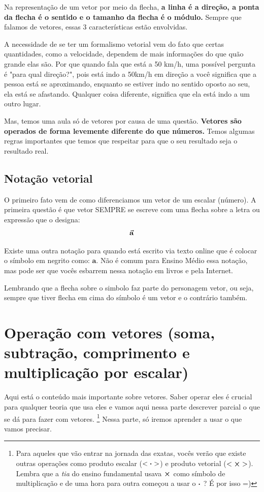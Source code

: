 \documentclass[12pt]{extarticle}
\newcommand{\<}{\langle}
\renewcommand{\>}{\rangle}
\theoremstyle{definition}
\begin{document}
Na representação de um vetor por meio da flecha, \textbf{a linha é a direção, a ponta da flecha é o sentido e o tamanho da flecha é o módulo.} Sempre que falamos de vetores, essas 3 características estão envolvidas.

A necessidade de se ter um formalismo vetorial vem do fato que certas quantidades, como a velocidade, dependem de mais informações do que quão grande elas são. Por que quando fala que está a 50 km/h, uma possível pergunta é "para qual direção?", pois está indo a 50km/h em direção a você significa que a pessoa está se aproximando, enquanto se estiver indo no sentido oposto ao seu, ela está se afastando. Qualquer coisa diferente, significa que ela está indo a um outro lugar.

Mas, temos uma aula só de vetores por causa de uma questão. \textbf{Vetores são operados de forma levemente diferente do que números.} Temos algumas regras importantes que temos que respeitar para que o seu resultado seja o resultado real.

\subsection{Notação vetorial}

O primeiro fato vem de como diferenciamos um vetor de um escalar (número). A primeira questão é que vetor SEMPRE se escreve com uma flecha sobre a letra ou expressão que o designa:
\begin{equation}
    \va{a}
\end{equation}

Existe uma outra notação para quando está escrito via texto online que é colocar o símbolo em negrito como: $\mathbf{a}$. Não é comum para Ensino Médio essa notação, mas pode ser que vocês esbarrem nessa notação em livros e pela Internet.

Lembrando que a flecha sobre o simbolo faz parte do personagem vetor, ou seja, sempre que tiver flecha em cima do símbolo é um vetor e o contrário também.

\section{Operação com vetores (soma, subtração, comprimento e multiplicação por escalar)}

Aqui está o conteúdo mais importante sobre vetores. Saber operar eles é crucial para qualquer teoria que usa eles e vamos aqui nessa parte descrever parcial o que se dá para fazer com vetores. \footnote{Para aqueles que vão entrar na jornada das exatas, vocês verão que existe outras operações como produto escalar ($<\vdot>$) e produto vetorial ($<\cross>$). Lembra que a \textit{tia} do ensino fundamental usava $\cross$ como símbolo de multiplicação e de uma hora para outra começou a usar o $\vdot$ ? É por isso =)} Nessa parte, só iremos aprender a usar o que vamos precisar.
\end{document}
